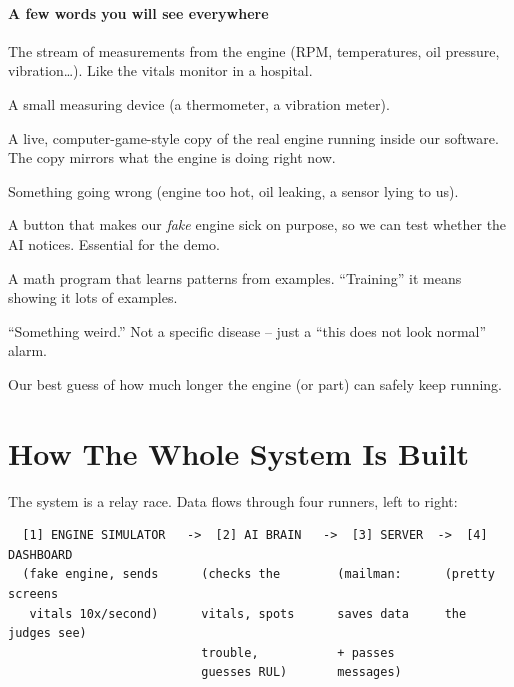 \documentclass[11pt]{article}
\begin{document}
\paragraph{A few words you will see everywhere}
\begin{description}[leftmargin=1.4em, style=nextline, font=\normalfont\bfseries]
  \item[Telemetry] The stream of measurements from the engine (RPM,
        temperatures, oil pressure, vibration\dots). Like the vitals monitor
        in a hospital.
  \item[Sensor] A small measuring device (a thermometer, a vibration meter).
  \item[Digital twin] A live, computer-game-style copy of the real engine
        running inside our software. The copy mirrors what the engine is
        doing right now.
  \item[Fault] Something going wrong (engine too hot, oil leaking, a sensor
        lying to us).
  \item[Fault injection] A button that makes our \emph{fake} engine sick on
        purpose, so we can test whether the AI notices. Essential for the
        demo.
  \item[Model / ML] A math program that learns patterns from examples.
        ``Training'' it means showing it lots of examples.
  \item[Anomaly] ``Something weird.'' Not a specific disease -- just a
        ``this does not look normal'' alarm.
  \item[RUL (Remaining Useful Life)] Our best guess of how much longer the
        engine (or part) can safely keep running.
\end{description}

\section{How The Whole System Is Built}

The system is a relay race. Data flows through four runners, left to right:

\begin{verbatim}
  [1] ENGINE SIMULATOR   ->  [2] AI BRAIN   ->  [3] SERVER  ->  [4] DASHBOARD
  (fake engine, sends      (checks the        (mailman:      (pretty screens
   vitals 10x/second)      vitals, spots      saves data     the judges see)
                           trouble,           + passes
                           guesses RUL)       messages)
\end{verbatim}
\end{document}

